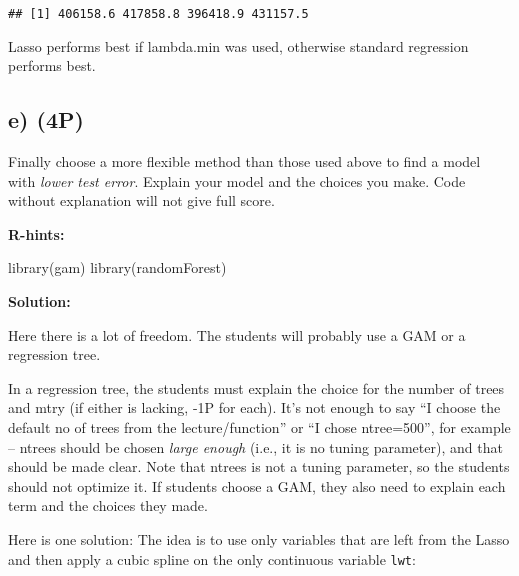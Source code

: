 \documentclass[
]{article}
\newenvironment{Shaded}{\begin{snugshade}}{\end{snugshade}}
\newcommand{\AttributeTok}[1]{\textcolor[rgb]{0.77,0.63,0.00}{#1}}
\newcommand{\DecValTok}[1]{\textcolor[rgb]{0.00,0.00,0.81}{#1}}
\newcommand{\FunctionTok}[1]{\textcolor[rgb]{0.00,0.00,0.00}{#1}}
\newcommand{\NormalTok}[1]{#1}
\newcommand{\OtherTok}[1]{\textcolor[rgb]{0.56,0.35,0.01}{#1}}
\newcommand{\SpecialCharTok}[1]{\textcolor[rgb]{0.00,0.00,0.00}{#1}}
\begin{document}
\begin{verbatim}
## [1] 406158.6 417858.8 396418.9 431157.5
\end{verbatim}

Lasso performs best if lambda.min was used, otherwise standard
regression performs best.

\hypertarget{e-4p}{%
\subsection{e) (4P)}\label{e-4p}}

Finally choose a more flexible method than those used above to find a
model with \emph{lower test error}. Explain your model and the choices
you make. Code without explanation will not give full score.

\textbf{R-hints:}

\begin{Shaded}
\begin{Highlighting}[]
\FunctionTok{library}\NormalTok{(gam)}
\FunctionTok{library}\NormalTok{(randomForest)}
\end{Highlighting}
\end{Shaded}

\textbf{Solution: }

Here there is a lot of freedom. The students will probably use a GAM or
a regression tree.

In a regression tree, the students must explain the choice for the
number of trees and mtry (if either is lacking, -1P for each). It's not
enough to say ``I choose the default no of trees from the
lecture/function'' or ``I chose ntree=500'', for example -- ntrees
should be chosen \emph{large enough} (i.e., it is no tuning parameter),
and that should be made clear. Note that ntrees is not a tuning
parameter, so the students should not optimize it. If students choose a
GAM, they also need to explain each term and the choices they made.

Here is one solution: The idea is to use only variables that are left
from the Lasso and then apply a cubic spline on the only continuous
variable \texttt{lwt}:

\begin{Shaded}
\end{Shaded}
\end{document}
